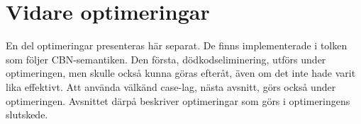\documentclass[../Optimise]{subfiles}
\begin{document}
\section{Vidare optimeringar}
En del optimeringar presenteras här separat. De finns implementerade
i tolken som följer CBN-semantiken. Den första, dödkodseliminering, utförs under optimeringen, men skulle också kunna göras efteråt, även om det inte hade varit lika
effektivt. Att använda välkänd case-lag, nästa avsnitt, görs också under
optimeringen. Avsnittet därpå beskriver optimeringar som görs i optimeringens
slutskede. 




\end{document}
